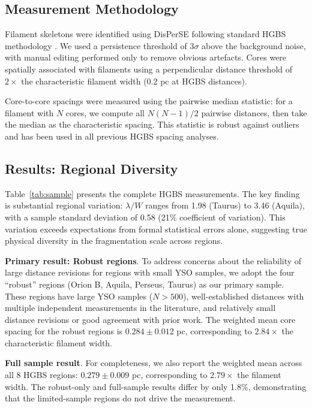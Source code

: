 \documentclass[twoside,twocolumn]{mnras}
\begin{document}
\subsection{Measurement Methodology}

Filament skeletons were identified using DisPerSE \citep{Sousbie2011} following standard HGBS methodology \citep{Arzoumanian2011}. We used a persistence threshold of $3\sigma$ above the background noise, with manual editing performed only to remove obvious artefacts. Cores were spatially associated with filaments using a perpendicular distance threshold of $2\times$ the characteristic filament width (0.2 pc at HGBS distances).

Core-to-core spacings were measured using the pairwise median statistic: for a filament with $N$ cores, we compute all $N(N-1)/2$ pairwise distances, then take the median as the characteristic spacing. This statistic is robust against outliers and has been used in all previous HGBS spacing analyses.

\subsection{Results: Regional Diversity}

Table~\ref{tab:sample} presents the complete HGBS measurements. The key finding is substantial regional variation: $\lambda/W$ ranges from 1.98 (Taurus) to 3.46 (Aquila), with a sample standard deviation of 0.58 (21\% coefficient of variation). This variation exceeds expectations from formal statistical errors alone, suggesting true physical diversity in the fragmentation scale across regions.

\textbf{Primary result: Robust regions}. To address concerns about the reliability of large distance revisions for regions with small YSO samples, we adopt the four ``robust'' regions (Orion B, Aquila, Perseus, Taurus) as our primary sample. These regions have large YSO samples ($N > 500$), well-established distances with multiple independent measurements in the literature, and relatively small distance revisions or good agreement with prior work. The weighted mean core spacing for the robust regions is $0.284 \pm 0.012$ pc, corresponding to $2.84\times$ the characteristic filament width.

\textbf{Full sample result}. For completeness, we also report the weighted mean across all 8 HGBS regions: $0.279 \pm 0.009$ pc, corresponding to $2.79\times$ the filament width. The robust-only and full-sample results differ by only 1.8\%, demonstrating that the limited-sample regions do not drive the measurement.
\end{document}
